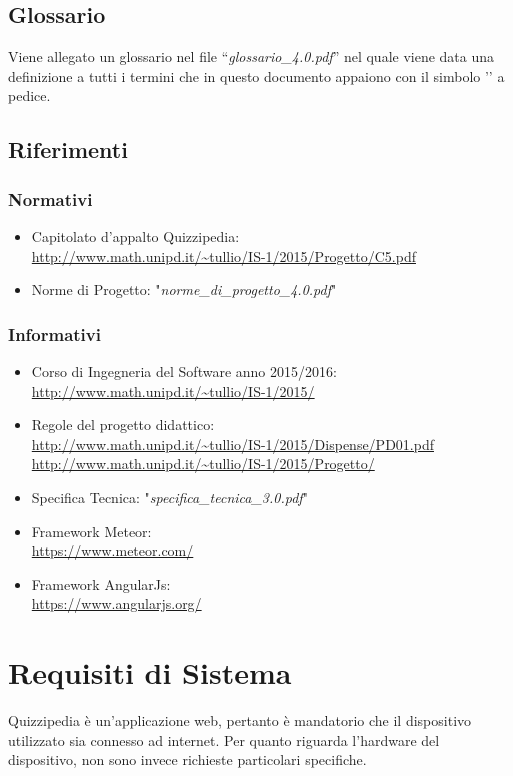 \documentclass[a4paper,11pt]{article}
\begin{document}
	\subsection{Glossario}
	Viene allegato un glossario nel file ``\textit{glossario\_4.0.pdf}'' nel quale viene data una definizione a tutti i termini che in questo documento appaiono con il simbolo '\addglos' a pedice.
	\subsection{Riferimenti}
		\subsubsection{Normativi}

		\begin{itemize}
			\item Capitolato d'appalto Quizzipedia:\\
			\url{http://www.math.unipd.it/~tullio/IS-1/2015/Progetto/C5.pdf}
			\item Norme di Progetto: "\textit{norme\_di\_progetto\_4.0.pdf}"
		\end{itemize}
		\subsubsection{Informativi}
		\begin{itemize}
			\item Corso di Ingegneria del Software anno 2015/2016:\\
			\url{http://www.math.unipd.it/~tullio/IS-1/2015/}
			\item Regole del progetto didattico:\\
			\url{http://www.math.unipd.it/~tullio/IS-1/2015/Dispense/PD01.pdf}\\
			\url{http://www.math.unipd.it/~tullio/IS-1/2015/Progetto/}
			\item Specifica Tecnica: "\textit{specifica\_tecnica\_3.0.pdf}"
			\item Framework Meteor:\\
			\url{https://www.meteor.com/}
			\item Framework AngularJs:\\
			\url{https://www.angularjs.org/}
		\end{itemize}
	\pagebreak
	\newpage
\section{Requisiti di Sistema}
Quizzipedia è un'applicazione web, pertanto è mandatorio che il dispositivo utilizzato sia connesso ad internet. Per quanto riguarda l'hardware del dispositivo, non sono invece richieste particolari specifiche.
\end{document}
